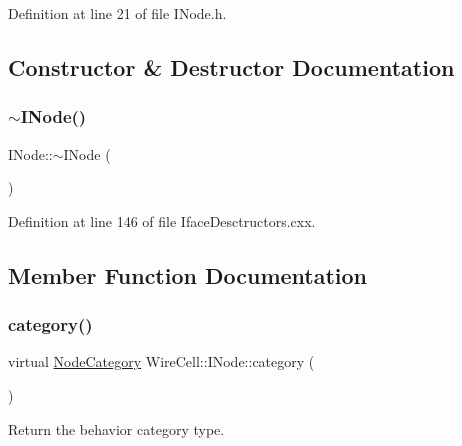 Definition at line 21 of file I\+Node.\+h.



\subsection{Constructor \& Destructor Documentation}
\mbox{\label{class_wire_cell_1_1_i_node_a38004973c3bcb18b6783cc47a75339d9}} 
\subsubsection{\texorpdfstring{$\sim$\+I\+Node()}{~INode()}}
{\footnotesize\ttfamily I\+Node\+::$\sim$\+I\+Node (\begin{DoxyParamCaption}{ }\end{DoxyParamCaption})\hspace{0.3cm}{\ttfamily [virtual]}}



Definition at line 146 of file Iface\+Desctructors.\+cxx.



\subsection{Member Function Documentation}
\mbox{\label{class_wire_cell_1_1_i_node_a58c07f15b165e5fb33bbc7b2e047b39b}} 
\subsubsection{\texorpdfstring{category()}{category()}}
{\footnotesize\ttfamily virtual \hyperlink{class_wire_cell_1_1_i_node_a5546e64cbb70bd3ac787295cac9ac803}{Node\+Category} Wire\+Cell\+::\+I\+Node\+::category (\begin{DoxyParamCaption}{ }\end{DoxyParamCaption})\hspace{0.3cm}{\ttfamily [pure virtual]}}



Return the behavior category type. 



